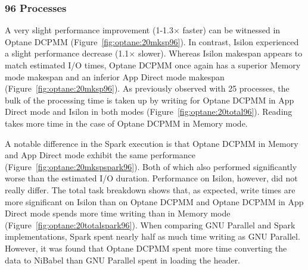 \subsubsection{96 Processes}

A very slight performance improvement (1-1.3$\times$ faster) can be witnessed in Optane
DCPMM (Figure~\ref{fig:optane:20mksp96}). In contrast, Isilon experienced a slight
performance decrease (1.1$\times$ slower). Whereas Isilon makespan appears to match
estimated I/O times, Optane DCPMM once again has a superior Memory mode makespan
and an inferior App Direct mode makespan (Figure~\ref{fig:optane:20mksp96}). As
previously observed with 25 processes, the bulk of the processing time is taken
up by writing for Optane DCPMM in App Direct mode and Isilon in both modes
(Figure~\ref{fig:optane:20total96}). Reading takes more time in the case of Optane
DCPMM in Memory mode. 


A notable difference in the Spark execution is that Optane DCPMM in Memory and
App Direct mode exhibit the same performance (Figure~\ref{fig:optane:20mkspspark96}).
Both of which also performed significantly worse than the estimated I/O
duration. Performance on Isilon, however, did not really differ. The total task
breakdown shows that, as expected, write times are more significant on Isilon
than on Optane DCPMM and Optane DCPMM in App Direct mode spends more time
writing than in Memory mode (Figure~\ref{fig:optane:20totalspark96}). When comparing
GNU Parallel and Spark implementations, Spark spent nearly half as much time
writing as GNU Parallel. However, it was found that Optane DCPMM spent more time
converting the data to NiBabel than GNU Parallel spent in loading the header.

